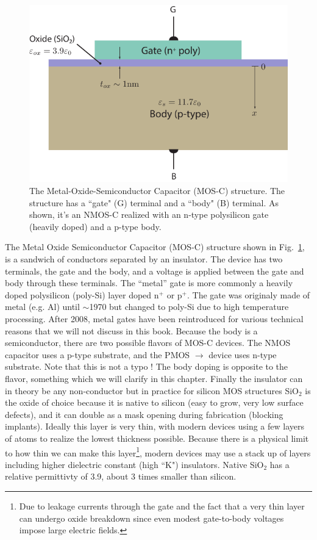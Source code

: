 \begin{figure}[tbh]
\begin{center}
\includegraphics[width=.65\columnwidth]{mos_cap_structure}
\end{center}
\caption{The Metal-Oxide-Semiconductor Capacitor  (MOS-C) structure.  The structure has a ``gate" (G) terminal and a ``body" (B) terminal.  As shown, it's an NMOS-C realized with an n-type polysilicon gate (heavily doped) and a p-type body.  } \label{fig:mos_cap}
\end{figure}

The  Metal Oxide Semiconductor Capacitor (MOS-C)  structure shown in Fig.~\ref{fig:mos_cap},  is a sandwich of conductors separated by an insulator.    The device has two terminals, the gate and the body, and a voltage is applied between the gate and body through these terminals.  The  “metal” gate is more commonly a heavily doped polysilicon (poly-Si) layer doped n$^+$ or p$^+$.  The gate was originaly made of metal (e.g. Al) until $\sim$1970 but changed to poly-Si due to high temperature processing. After 2008, metal gates have been reintroduced for various technical reasons that we will not discuss in this book.  Because the body is a semiconductor, there are two possible flavors of MOS-C devices.  The NMOS capacitor uses a  p-type substrate, and the PMOS  $\rightarrow$ device uses n-type substrate.  Note that this is not a typo !  The body doping is opposite to the flavor, something which we will clarify in this chapter.  Finally the insulator can in theory be any non-conductor but in practice for silicon MOS structures SiO$_2$ is the oxide of choice because it is native to silicon (easy to grow, very low surface defects), and it can double as a mask opening during fabrication (blocking implants).  Ideally this layer is very thin, with modern devices using a few layers of atoms to realize the lowest thickness possible.  Because there is a physical limit to how thin we can make this layer\footnote{Due to leakage currents through the gate and the fact that a very thin layer can undergo oxide breakdown since even modest gate-to-body voltages impose large electric fields.}, modern devices may use a stack up of layers including higher dielectric constant (high ``K") insulators.  Native SiO$_2$ has a relative permittivty of 3.9, about 3 times smaller than silicon.
 




